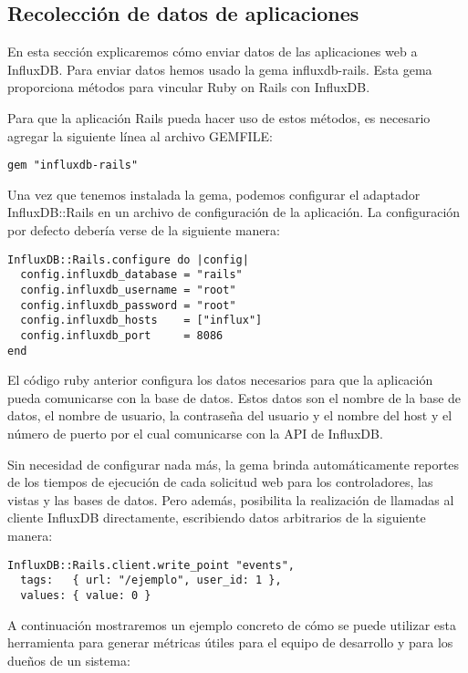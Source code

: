 \subsection{Recolección de datos de aplicaciones}
\label{aplicaciones}

En  esta sección explicaremos cómo enviar datos de las aplicaciones web a InfluxDB.
Para enviar datos hemos usado la gema influxdb-rails.
Esta gema proporciona métodos para vincular Ruby on Rails con InfluxDB.

Para que la aplicación Rails pueda hacer uso de estos métodos, es necesario agregar la siguiente línea al archivo GEMFILE:

\begin{lstlisting}
gem "influxdb-rails"
\end{lstlisting}

Una vez que tenemos instalada la gema, podemos configurar el adaptador InfluxDB::Rails en un archivo de configuración de la aplicación. La configuración por defecto debería verse de la siguiente manera:

\begin{lstlisting}
InfluxDB::Rails.configure do |config|
  config.influxdb_database = "rails"
  config.influxdb_username = "root"
  config.influxdb_password = "root"
  config.influxdb_hosts    = ["influx"]
  config.influxdb_port     = 8086
end
\end{lstlisting}

El código ruby anterior configura los datos necesarios para que la aplicación pueda comunicarse con la base de datos. Estos datos son el nombre de la base de datos, el nombre de usuario, la contraseña del usuario y el nombre del host y el número de puerto por el cual comunicarse con la API de InfluxDB.

Sin necesidad de configurar nada más, la gema brinda automáticamente reportes de los tiempos de ejecución de cada solicitud web para los controladores, las vistas y las bases de datos. Pero además, posibilita la realización de llamadas al cliente InfluxDB directamente, escribiendo datos arbitrarios de la siguiente manera:

\begin{lstlisting}
InfluxDB::Rails.client.write_point "events",
  tags:   { url: "/ejemplo", user_id: 1 },
  values: { value: 0 }
\end{lstlisting}

A continuación mostraremos un ejemplo concreto de cómo se puede utilizar esta herramienta para generar métricas útiles para el equipo de desarrollo y para los dueños de un sistema:

